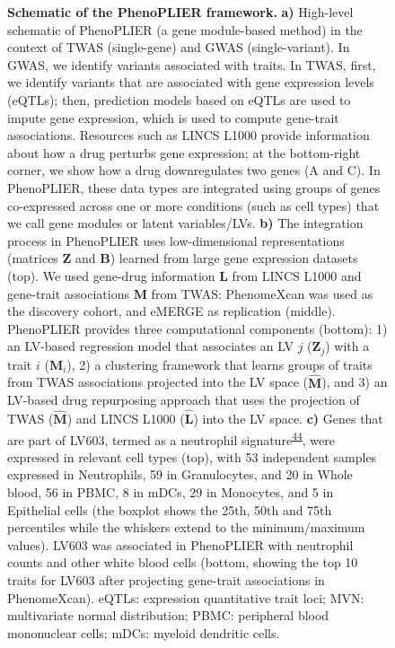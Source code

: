 \documentclass[
  a4paper,
]{article}
\begin{document}
\begin{figure}
\hypertarget{fig:entire_process}{%
\centering
\caption{\textbf{Schematic of the PhenoPLIER framework.}
\textbf{a)} High-level schematic of PhenoPLIER (a gene module-based method) in the context of TWAS (single-gene) and GWAS (single-variant).
In GWAS, we identify variants associated with traits.
In TWAS, first, we identify variants that are associated with gene expression levels (eQTLs); then, prediction models based on eQTLs are used to impute gene expression, which is used to compute gene-trait associations.
Resources such as LINCS L1000 provide information about how a drug perturbs gene expression; at the bottom-right corner, we show how a drug downregulates two genes (A and C).
In PhenoPLIER, these data types are integrated using groups of genes co-expressed across one or more conditions (such as cell types) that we call gene modules or latent variables/LVs.
\textbf{b)} The integration process in PhenoPLIER uses low-dimensional representations (matrices \(\mathbf{Z}\) and \(\mathbf{B}\)) learned from large gene expression datasets (top).
We used gene-drug information \(\mathbf{L}\) from LINCS L1000 and gene-trait associations \(\mathbf{M}\) from TWAS: PhenomeXcan was used as the discovery cohort, and eMERGE as replication (middle).
PhenoPLIER provides three computational components (bottom):
1) an LV-based regression model that associates an LV \(j\) (\(\mathbf{Z}_j\)) with a trait \(i\) (\(\mathbf{M}_i\)),
2) a clustering framework that learns groups of traits from TWAS associations projected into the LV space (\(\hat{\mathbf{M}}\)),
and 3) an LV-based drug repurposing approach that uses the projection of TWAS (\(\hat{\mathbf{M}}\)) and LINCS L1000 (\(\hat{\mathbf{L}}\)) into the LV space.
\textbf{c)} Genes that are part of LV603, termed as a neutrophil signature\textsuperscript{\protect\hyperlink{ref-14rnBunuZ}{44}}, were expressed in relevant cell types (top), with 53 independent samples expressed in Neutrophils, 59 in Granulocytes, and 20 in Whole blood, 56 in PBMC, 8 in mDCs, 29 in Monocytes, and 5 in Epithelial cells (the boxplot shows the 25th, 50th and 75th percentiles while the whiskers extend to the minimum/maximum values).
LV603 was associated in PhenoPLIER with neutrophil counts and other white blood cells (bottom, showing the top 10 traits for LV603 after projecting gene-trait associations in PhenomeXcan).
eQTLs: expression quantitative trait loci;
MVN: multivariate normal distribution;
PBMC: peripheral blood mononuclear cells;
mDCs: myeloid dendritic cells.}\label{fig:entire_process}
}
\end{figure}
\end{document}
